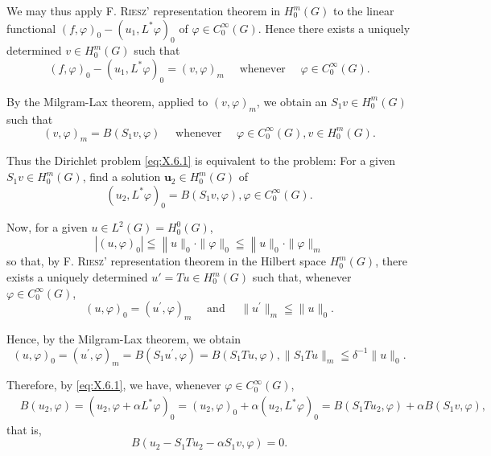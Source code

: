 We may thus apply F. \textsc{Riesz}' representation theorem in $H_0^m(G)$ to the linear functional $(f, \varphi)_0 - (u_1, L^*\varphi)_0$ of $\varphi \in C_0^\infty(G)$. Hence there exists a uniquely determined $v \in H_0^m(G)$ such that 
\[
(f, \varphi) _{0} - (u _{1}, L ^{*} \varphi) _{0} = (v, \varphi) _{m} \quad \text{ whenever } \quad \varphi \in C _{0} ^{\infty} (G).
\]

By the Milgram-Lax theorem, applied to $(v,\varphi)_m$, we obtain an $S_1v\in H_0^m (G)$ such that 
\[
(v, \varphi) _{m} = B (S _{1} v, \varphi) \quad \text{ whenever } \quad \varphi \in C _{0} ^{\infty} (G), v \in H _{0} ^{m} (G).
\]

Thus the Dirichlet problem \eqref{eq:X.6.1} is equivalent to the problem: For a given $S_{1}v\in H_{0}^{m}(G)$, find a solution $\pmb{u}_{2}\in H_{0}^{m}(G)$ of 
\begin{equation}\tag{1'}\label{eq:X.6.1'}
(u _{2}, L ^{*} \varphi) _{0} = B (S _{1} v, \varphi), \varphi \in C _{0} ^{\infty} (G).
\end{equation}

Now, for a given $u \in L^2(G) = H_0^0(G)$, 
\[
\left| (u, \varphi) _{0} \right| \leqq \left\| u \| _{0} \cdot \| \varphi \| _{0} \right. \leqq \left\| u \| _{0} \cdot \| \varphi \| _{m} \right.
\]
so that, by F. \textsc{Riesz}' representation theorem in the Hilbert space $H_0^m(G)$, there exists a uniquely determined $u' = Tu \in H_0^m(G)$ such that, whenever $\varphi \in C_0^\infty(G)$, 
\[
(u, \varphi) _{0} = (u ^{\prime}, \varphi) _{m} \quad \text{ and } \quad \| u ^{\prime} \| _{m} \leqq \| u \| _{0}.
\]

Hence, by the Milgram-Lax theorem, we obtain 
\begin{equation}\label{eq:X.6.9}
(u, \varphi) _{0} = (u ^{\prime}, \varphi) _{m} = B \left(S _{1} u ^{\prime}, \varphi\right) = B \left(S _{1} T u, \varphi\right), \| S _{1} T u \| _{m} \leqq \delta^{-1} \| u \| _{0}.
\end{equation}

Therefore, by \eqref{eq:X.6.1}, we have, whenever $\varphi \in C_0^\infty(G)$, 
\[
\begin{aligned}
&B (u _{2}, \varphi)  = (u _{2}, \varphi + \alpha L ^{*} \varphi) _{0} = (u _{2}, \varphi) _{0} + \alpha (u _{2}, L ^{*} \varphi) _{0} = B (S _{1} T u _{2}, \varphi) + \alpha B (S _{1} v, \varphi),
\end{aligned}
\]
that is, 
\[
B \left(u _{2} - S _{1} T u _{2} - \alpha S _{1} v, \varphi\right) = 0.
\]

